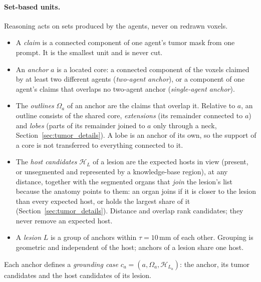 \documentclass[fleqn,10pt]{olplainarticle}
\begin{document}
\paragraph{Set-based units.}
Reasoning acts on sets produced by the agents, never on redrawn voxels.
\begin{itemize}
\item A \emph{claim} is a connected component of one agent's tumor mask from one prompt. It is the smallest unit and is
never cut.
\item An \emph{anchor} $a$ is a located core: a connected component of the voxels claimed by at least two different
agents (\emph{two-agent anchor}), or a component of one agent's claims that overlaps no two-agent anchor
(\emph{single-agent anchor}).
\item The \emph{outlines} $\Omega_a$ of an anchor are the claims that overlap it. Relative to $a$, an outline consists of
the shared core, \emph{extensions} (its remainder connected to $a$) and \emph{lobes} (parts of its remainder joined to
$a$ only through a neck, Section~\ref{sec:tumor_details}). A lobe is an anchor of its own, so the support of a core is not
transferred to everything connected to it.
\item The \emph{host candidates} $\mathcal{H}_L$ of a lesion are the expected hosts in view (present, or unsegmented
and represented by a knowledge-base region), at any distance, together with the segmented organs that \emph{join} the
lesion's list because the anatomy points to them: an organ joins if it is closer to the lesion than every expected host,
or holds the largest share of it (Section~\ref{sec:tumor_details}). Distance and overlap rank candidates; they never remove
an expected host.
\item A \emph{lesion} $L$ is a group of anchors within $\tau=10$\,mm of each other. Grouping is geometric and independent
of the host; anchors of a lesion share one host.
\end{itemize}
Each anchor defines a \emph{grounding case} $c_a=(a,\Omega_a,\mathcal{H}_{L_a})$: the anchor, its tumor candidates and
the host candidates of its lesion.
\end{document}
